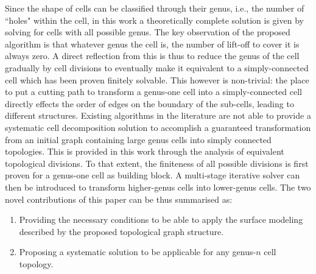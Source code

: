 \documentclass[conference]{IEEEtran}
\begin{document}

Since the shape of cells can be classified through their genus, i.e., the number of ``holes" within the cell, in this work a 
theoretically complete solution is given by solving for cells with all possible genus. The key observation of the proposed algorithm is that 
whatever genus the cell is, the number of lift-off to cover it is always zero. %
A direct reflection from this is thus to reduce the genus of the cell gradually by cell divisions to eventually make it equivalent to a 
simply-connected cell which has been proven finitely solvable. This however is non-trivial: the place to put a cutting path to transform 
a genus-one cell into a simply-connected cell directly effects the order of edges on the boundary of the sub-cells, leading to different structures. %
Existing algorithms in the literature are not able to provide a systematic cell decomposition solution to accomplish a guaranteed 
transformation from an initial graph containing large genus cells into simply connected topologies. This is provided in this work through 
the analysis of equivalent topological divisions. To that extent, the finiteness of all possible divisions is first proven for a genus-one cell as 
building block. A multi-stage iterative solver can then be introduced to transform higher-genus cells into lower-genus cells. The two novel 
contributions of this paper can be thus summarised as:
\begin{enumerate}
\item Providing the necessary conditions to be able to apply the surface modeling described by the proposed topological graph structure. %
\item Proposing a systematic solution to be applicable for any genus-$n$ cell topology. 
\end{enumerate}
\end{document}
